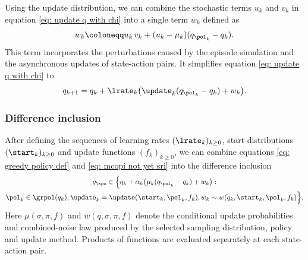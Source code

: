 Using the update distribution, 
we can combine the stochastic terms $u_k$ and $v_k$ in equation \eqref{eq: update q with chi} into a single term $w_k$ defined as
\begin{align}
\label{eq: definition combined noise}
    w_k
    \coloneqq 
    u_k \, v_k + (u_k - \mu_k) ( q_{\pol_k} - q_k ) .
\end{align}
This term incorporates the perturbations caused by the episode simulation and the asynchronous updates of state-action pairs.
It simplifies equation \eqref{eq: update q with chi} to
\begin{align}
\label{eq: mcopi not yet sri}
    q_{k+1}
    =
    q_k + \lrate_k \big( \update_k ( q_{\pol_k} - q_k ) + w_k \big) .
\end{align}





























\subsubsection{Difference inclusion}


After defining the sequences of learning rates $(\lrate_k)_{k \ge 0}$, start distributions $(\start_k)_{k \ge 0}$ and update functions $(f_k)_{k \ge 0}$,
we can combine equations \eqref{eq: greedy policy def} and \eqref{eq: mcopi not yet sri} into the difference inclusion
\begin{multline}
\label{eq: mcopi sa}
    q_\kpo
    \in
    \Big\{ q_k + \alpha_k \big( \mu_k(q_{\pol_k} - q_k) + w_k \big) 
    :
    \\
    \pol_k \in \grpol(q_k),
    \update_k = \update(\start_k, \pol_k, f_k),
    w_k \sim w(q_k, \start_k, \pol_k, f_k)
    \Big\} .
\end{multline}
Here $\mu(\sigma,\pi,f)$ and $w(q,\sigma,\pi,f)$ denote the conditional update probabilities and combined-noise law produced by the selected sampling distribution, policy and update method. Products of functions are evaluated separately at each state-action pair.


